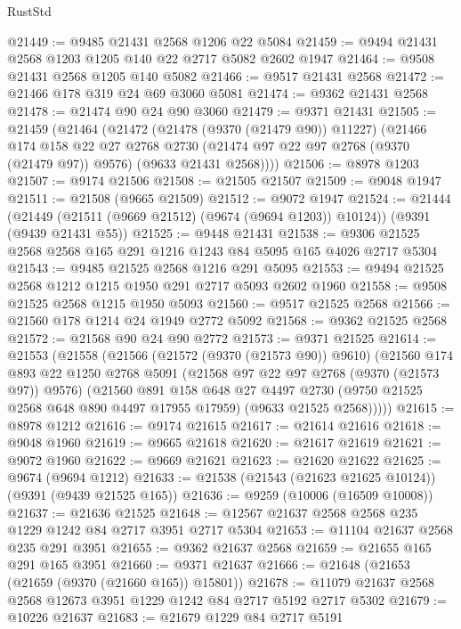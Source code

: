 \begin{lexlean}{RustStd}
\begin{coremodule}
@21449 := @9485 @21431 @2568 @1206 @22 @5084
@21459 := @9494 @21431 @2568 @1203 @1205 @140 @22 @2717 @5082 @2602 @1947
@21464 := @9508 @21431 @2568 @1205 @140 @5082
@21466 := @9517 @21431 @2568
@21472 := @21466 @178 @319 @24 @69 @3060 @5081
@21474 := @9362 @21431 @2568
@21478 := @21474 @90 @24 @90 @3060
@21479 := @9371 @21431
@21505 := @21459
    (@21464
      (@21472
        (@21478 (@9370 (@21479 @90)) @11227)
        (@21466
          @174
          @158
          @22
          @27
          @2768
          @2730
          (@21474 @97 @22 @97 @2768 (@9370 (@21479 @97)) @9576)
          (@9633 @21431 @2568))))
@21506 := @8978 @1203
@21507 := @9174 @21506
@21508 := @21505 @21507
@21509 := @9048 @1947
@21511 := @21508 (@9665 @21509)
@21512 := @9072 @1947
@21524 := @21444
    (@21449 (@21511 (@9669 @21512) (@9674 (@9694 @1203)) @10124))
    (@9391 (@9439 @21431 @55))
@21525 := @9448 @21431
@21538 := @9306 @21525 @2568 @2568 @165 @291 @1216 @1243 @84 @5095 @165 @4026 @2717 @5304
@21543 := @9485 @21525 @2568 @1216 @291 @5095
@21553 := @9494 @21525 @2568 @1212 @1215 @1950 @291 @2717 @5093 @2602 @1960
@21558 := @9508 @21525 @2568 @1215 @1950 @5093
@21560 := @9517 @21525 @2568
@21566 := @21560 @178 @1214 @24 @1949 @2772 @5092
@21568 := @9362 @21525 @2568
@21572 := @21568 @90 @24 @90 @2772
@21573 := @9371 @21525
@21614 := @21553
    (@21558
      (@21566
        (@21572 (@9370 (@21573 @90)) @9610)
        (@21560
          @174
          @893
          @22
          @1250
          @2768
          @5091
          (@21568 @97 @22 @97 @2768 (@9370 (@21573 @97)) @9576)
          (@21560
            @891
            @158
            @648
            @27
            @4497
            @2730
            (@9750 @21525 @2568 @648 @890 @4497 @17955 @17959)
            (@9633 @21525 @2568)))))
@21615 := @8978 @1212
@21616 := @9174 @21615
@21617 := @21614 @21616
@21618 := @9048 @1960
@21619 := @9665 @21618
@21620 := @21617 @21619
@21621 := @9072 @1960
@21622 := @9669 @21621
@21623 := @21620 @21622
@21625 := @9674 (@9694 @1212)
@21633 := @21538 (@21543 (@21623 @21625 @10124)) (@9391 (@9439 @21525 @165))
@21636 := @9259 (@10006 (@16509 @10008))
@21637 := @21636 @21525
@21648 := @12567 @21637 @2568 @2568 @235 @1229 @1242 @84 @2717 @3951 @2717 @5304
@21653 := @11104 @21637 @2568 @235 @291 @3951
@21655 := @9362 @21637 @2568
@21659 := @21655 @165 @291 @165 @3951
@21660 := @9371 @21637
@21666 := @21648 (@21653 (@21659 (@9370 (@21660 @165)) @15801))
@21678 := @11079 @21637 @2568 @2568 @12673 @3951 @1229 @1242 @84 @2717 @5192 @2717 @5302
@21679 := @10226 @21637
@21683 := @21679 @1229 @84 @2717 @5191

\end{coremodule}
\end{lexlean}
